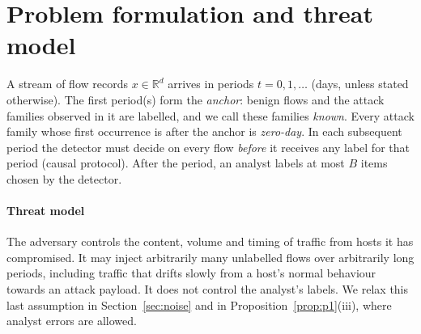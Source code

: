 \documentclass[preprint,12pt]{elsarticle}
\newcommand{\R}{\mathbb{R}}
\begin{document}
\begin{table}[t]
\centering\small
\caption{Positioning. \checkmark: property holds by design; $\circ$: partially; --: no.}\label{tab:positioning}
\end{table}

\section{Problem formulation and threat model}\label{sec:problem}
A stream of flow records $x\in\R^d$ arrives in periods $t=0,1,\dots$ (days, unless stated otherwise). The first period(s) form the \emph{anchor}: benign flows and the attack families observed in it are labelled, and we call these families \emph{known}. Every attack family whose first occurrence is after the anchor is \emph{zero-day}. In each subsequent period the detector must decide on every flow \emph{before} it receives any label for that period (causal protocol). After the period, an analyst labels at most $B$ items chosen by the detector.

\paragraph{Threat model}
The adversary controls the content, volume and timing of traffic from hosts it has compromised. It may inject arbitrarily many unlabelled flows over arbitrarily long periods, including traffic that drifts slowly from a host's normal behaviour towards an attack payload. It does not control the analyst's labels. We relax this last assumption in Section~\ref{sec:noise} and in Proposition~\ref{prop:p1}(iii), where analyst errors are allowed.
\end{document}
